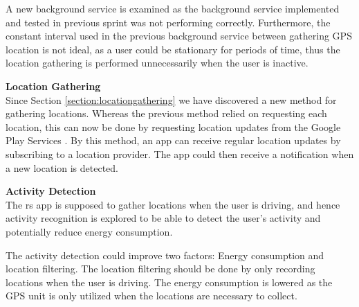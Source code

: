 A new background service is examined as the background service implemented and tested in previous sprint was not performing correctly.
Furthermore, the constant interval used in the previous background service between gathering GPS location is not ideal, as a user could be stationary for periods of time, thus the location gathering is performed unnecessarily when the user is inactive.

\textbf{Location Gathering}\\
Since Section \ref{section:locationgathering} we have discovered a new method for gathering locations. 
Whereas the previous method relied on requesting each location, this can now be done by requesting location updates from the Google Play Services \cite{receivingLocationUpdates}.
By this method, an app can receive regular location updates by subscribing to a location provider.
The app could then receive a notification when a new location is detected.

\textbf{Activity Detection}\\
The \gls{rs} app is supposed to gather locations when the user is driving, and hence activity recognition is explored to be able to detect the user's activity and potentially reduce energy consumption.

The activity detection could improve two factors: Energy consumption and location filtering.
The location filtering should be done by only recording locations when the user is driving.
The energy consumption is lowered as the GPS unit is only utilized when the locations are necessary to collect.
